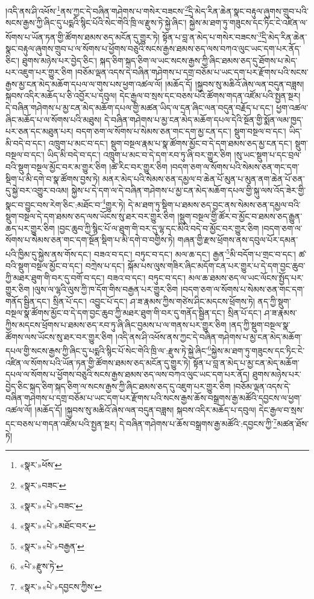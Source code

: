 །འདི་ནས་ཤི་འཕོས་\footnote{«སྣར་»ཕོས་}ནས་ཀྱང་དེ་བཞིན་གཤེགས་པ་གསེར་བཟངས་\footnote{«སྣར་»བཟང་}དྲི་མེད་རིན་ཆེན་སྣང་བརྟུལ་ཞུགས་གྲུབ་པའི་སངས་རྒྱས་ཀྱི་ཞིང་དུ་པདྨའི་སྙིང་པོའི་སེང་གེའི་ཁྲི་ལ་རྫུས་ཏེ་སྐྱེ་ཞིང་། སྐྱེས་མ་ཐག་ཏུ་གཟུངས་དང་ཏིང་ངེ་འཛིན་ལ་སོགས་པ་ཡོན་ཏན་གྱི་ཚོགས་ཐམས་ཅད་མངོན་དུ་གྱུར་ཏེ། སྟོན་པ་བླ་ན་མེད་པ་གསེར་བཟངས་\footnote{«སྣར་»«པེ་»བཟང་}དྲི་མེད་རིན་ཆེན་སྣང་བརྟུལ་ཞུགས་གྲུབ་པ་ལ་སོགས་པ་ཕྱོགས་བཅུའི་སངས་རྒྱས་ཐམས་ཅད་ལས་བཀའ་ལུང་ཡང་དག་པར་ནོད་ཅིང་། ཐུགས་མཉེས་པར་བྱེད་ཅིང་། སྐད་ཅིག་སྐད་ཅིག་ལ་ཡང་སངས་རྒྱས་ཀྱི་ཞིང་ཐམས་ཅད་དུ་ཐོགས་པ་མེད་པར་འཇུག་པར་གྱུར་ཅིག །བཅོམ་ལྡན་འདས་དེ་བཞིན་གཤེགས་པ་དགྲ་བཅོམ་པ་ཡང་དག་པར་རྫོགས་པའི་སངས་རྒྱས་མྱ་ངན་མེད་མཆོག་དཔལ་ལ་གུས་པས་ཕྱག་འཚལ་ལོ། །མཆོད་དོ། །སྐྱབས་སུ་མཆིའོ་ཞེས་ལན་བདུན་བཟླས། སྐབས་འདིར་མཆོད་པ་ཅི་འབྱོར་པ་དབུལ། དེང་རྒྱལ་བ་སྲས་དང་བཅས་པའི་ཚོགས་གདན་འཛོམ་པའི་སྤྱན་སྔར། དེ་བཞིན་གཤེགས་པ་མྱ་ངན་མེད་མཆོག་དཔལ་གྱི་མཚན་ཡིད་ལ་དྲན་ཞིང་ལན་བདུན་བརྗོད་པ་དང་། ཕྱག་འཚལ་ཞིང་མཆོད་པ་ལ་སོགས་པའི་མཐུས། དེ་བཞིན་གཤེགས་པ་མྱ་ངན་མེད་མཆོག་དཔལ་དེའི་སྔོན་གྱི་སྨོན་ལམ་ཁྱད་པར་ཅན་དང་མཐུན་པར། བདག་ཅག་ལ་སོགས་པ་སེམས་ཅན་གང་དག་མྱ་ངན་དང་། སྡུག་བསྔལ་བ་དང་། ཡིད་མི་བདེ་བ་དང་། འཁྲུག་པ་མང་བ་དང་། སྡུག་བསྔལ་རྣམ་པ་སྣ་ཚོགས་མྱོང་བ་དེ་དག་ཐམས་ཅད་མྱ་ངན་དང་། སྡུག་བསྔལ་བ་དང་། ཡིད་མི་བདེ་བ་དང་། འཁྲུག་པ་མང་བ་དེ་དག་རབ་ཏུ་ཞི་བར་གྱུར་ཅིག །སུ་ཡང་སྡུག་པ་དང་བྲལ་བའི་སྡུག་བསྔལ་མྱོང་བར་མ་གྱུར་ཅིག །ཚེ་རིང་བར་གྱུར་ཅིག །བདག་ཅག་ལ་སོགས་པའི་སེམས་ཅན་གང་དག་སྡིག་པ་མི་དགེ་བ་སྣ་ཚོགས་བྱས་ཏེ། མནར་མེད་པའི་སེམས་ཅན་དམྱལ་བ་ཆེན་པོ་མུན་པ་མུན་ནག་ཆེན་པོ་ཅན་དུ་སྐྱེ་བར་འགྱུར་བའམ། སྐྱེས་པ་དེ་དག་ལ་དེ་བཞིན་གཤེགས་པ་མྱ་ངན་མེད་མཆོག་དཔལ་གྱི་སྐུ་ལས་འོད་ཟེར་གྱི་སྣང་བ་བྱུང་བས་རེག་ཅིང་:མཐོང་བ་\footnote{«སྣར་»«པེ་»མཐོང་བར་}གྱུར་ཏེ། དེ་མ་ཐག་ཏུ་སྡིག་པ་ཐམས་ཅད་བྱང་ནས་སེམས་ཅན་དམྱལ་བའི་སྡུག་བསྔལ་དེ་དག་ཐམས་ཅད་ལས་ཡོངས་སུ་ཐར་བར་གྱུར་ཅིག །སྡུག་བསྔལ་གྱི་ཚོར་བ་མྱོང་བ་ཐམས་ཅད་རྒྱུན་ཆད་པར་གྱུར་ཅིག །བྱང་ཆུབ་ཀྱི་སྙིང་པོ་ལ་ཐུག་གི་བར་དུ་ལྷ་དང་མིའི་བདེ་བ་མྱོང་བར་གྱུར་ཅིག །བདག་ཅག་ལ་སོགས་པ་སེམས་ཅན་གང་དག་སྔོན་སྡིག་པ་མི་དགེ་བ་བགྱིས་ཏེ། གཞན་གྱི་རྫས་ཕྲོགས་ནས་དབུལ་པོར་དམན་པའི་ཁྱིམ་དུ་སྐྱེས་ནས་གོས་དང་། བཟའ་བ་དང་། བཏུང་བ་དང་། མལ་ཆ་དང་། རྒྱན་\footnote{«སྣར་»«པེ་»བརྒྱན་}མི་བདོག་པ་གྲང་བ་དང་། ཚ་བའི་སྡུག་བསྔལ་མྱོང་བ་དང་། བཀྲེས་པ་དང་། སྐོམ་པས་ལུས་གཟིར་ཞིང་མདོག་ངན་པར་གྱུར་པ་དེ་དག་བྱང་ཆུབ་ཀྱི་མཐར་ཐུག་གི་བར་དུ་བགོ་བ་དང་། བཟའ་བ་དང་། བཏུང་བ་དང་། མལ་ཆ་ཐམས་ཅད་ལ་ཡང་ལོངས་སྤྱོད་པར་གྱུར་ཅིག །ལུས་ལ་ལྷའི་ལུས་ཀྱི་ཁ་དོག་གིས་བརྒྱན་པར་གྱུར་ཅིག །བདག་ཅག་ལ་སོགས་པ་སེམས་ཅན་གང་དག་གནོད་སྦྱིན་དང་། སྲིན་པོ་དང་། འབྱུང་པོ་དང་། ཤ་ཟ་རྣམས་ཀྱིས་གཙེས་ཤིང་མདངས་ཕྲོགས་ཏེ། ནད་ཀྱི་སྡུག་བསྔལ་སྣ་ཚོགས་མྱོང་བ་དེ་དག་བྱང་ཆུབ་ཀྱི་མཐར་ཐུག་གི་བར་དུ་གནོད་སྦྱིན་དང་། སྲིན་པོ་དང་། ཤ་ཟ་རྣམས་ཀྱིས་མདངས་ཕྲོགས་པ་ཐམས་ཅད་རབ་ཏུ་ཞི་ཞིང་བྱམས་པ་ལ་གནས་པར་གྱུར་ཅིག །ནད་ཀྱི་སྡུག་བསྔལ་སྣ་ཚོགས་ལས་ཡོངས་སུ་ཐར་བར་གྱུར་ཅིག །འདི་ནས་ཤི་འཕོས་ནས་ཀྱང་དེ་བཞིན་གཤེགས་པ་མྱ་ངན་མེད་མཆོག་དཔལ་གྱི་སངས་རྒྱས་ཀྱི་ཞིང་དུ་པདྨའི་སྙིང་པོ་སེང་གེའི་ཁྲི་ལ་:རྫུས་ཏེ་སྐྱེ་ཞིང་\footnote{«པེ་»རྫུས་ཏེ་}སྐྱེས་མ་ཐག་ཏུ་གཟུངས་དང་ཏིང་ངེ་འཛིན་ལ་སོགས་པའི་ཡོན་ཏན་གྱི་ཚོགས་ཐམས་ཅད་མངོན་དུ་གྱུར་ཏེ། སྟོན་པ་བླ་ན་མེད་པ་མྱ་ངན་མེད་མཆོག་དཔལ་ལ་སོགས་པ་ཕྱོགས་བཅུའི་སངས་རྒྱས་ཐམས་ཅད་ལས་བཀའ་ལུང་ཡང་དག་པར་ནོད། ཐུགས་མཉེས་པར་བྱེད་ཅིང་སྐད་ཅིག་སྐད་ཅིག་ལ་སངས་རྒྱས་ཀྱི་ཞིང་ཐམས་ཅད་དུ་འཇུག་པར་གྱུར་ཅིག །བཅོམ་ལྡན་འདས་དེ་བཞིན་གཤེགས་པ་དགྲ་བཅོམ་པ་ཡང་དག་པར་རྫོགས་པའི་སངས་རྒྱས་ཆོས་བསྒྲགས་རྒྱ་མཚོའི་དབྱངས་ལ་ཕྱག་འཚལ་ལོ། །མཆོད་དོ། །སྐྱབས་སུ་མཆིའོ་ཞེས་ལན་བདུན་བཟླས། སྐབས་འདིར་མཆོད་པ་དབུལ། དེང་རྒྱལ་བ་སྲས་དང་བཅས་པ་གདན་འཛོམ་པའི་སྤྱན་སྔར། དེ་བཞིན་གཤེགས་པ་ཆོས་བསྒྲགས་རྒྱ་མཚོའི་:དབྱངས་ཀྱི་\footnote{«སྣར་»«པེ་»དབྱངས་ཀྱིས་}མཚན་ཐོས་ཏེ། 